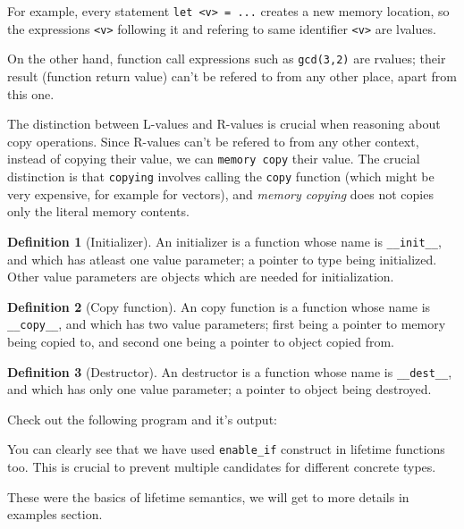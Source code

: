 \documentclass[times, utf8, diplomski]{fer}
\theoremstyle{definition}
\newtheorem{definition}{Definition}[]
\begin{document}
For example, every statement \texttt{let <v> = ...} creates a new memory location,
so the expressions \texttt{<v>} following it and refering to same identifier \texttt{<v>} are lvalues.

On the other hand, function call expressions such as \texttt{gcd(3,2)} are rvalues; their result
(function return value) can't be refered to from any other place, apart from this one.

The distinction between L-values and R-values is crucial when reasoning about copy operations.
Since R-values can't be refered to from any other context, instead of copying their value, 
we can \texttt{memory copy} their value. The crucial distinction is that \texttt{copying}
involves calling the \texttt{copy} function (which might be very expensive, for example for vectors),
and \textit{memory copying} does not copies only the literal memory contents.

\begin{definition}[Initializer]
An initializer is a function whose name is \texttt{__init__}, and which has atleast one value parameter;
a pointer to type being initialized. Other value parameters are objects which are needed for initialization.
\end{definition}

\begin{definition}[Copy function]
An copy function is a function whose name is \texttt{__copy__}, and which has two value parameters;
first being a pointer to memory being copied to, and second one being a pointer to object copied from.
\end{definition}

\begin{definition}[Destructor]
An destructor is a function whose name is \texttt{__dest__}, and which has only one value parameter;
a pointer to object being destroyed.
\end{definition}

Check out the following program and it's output:




You can clearly see that we have used \texttt{enable\_if} construct in lifetime functions too.
This is crucial to prevent multiple candidates for different concrete types.

These were the basics of lifetime semantics, we will get to more details in examples section.
\end{document}
